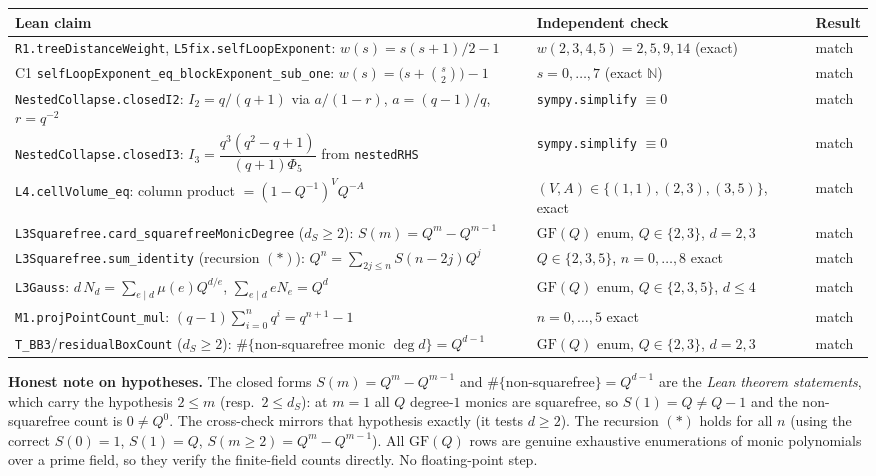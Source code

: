 \documentclass[11pt]{article}
\newcommand{\code}[1]{\texttt{#1}}
\begin{document}
\begin{longtable}{@{}p{}p{}p{}@{}}
\toprule
\textbf{Lean claim} & \textbf{Independent check} & \textbf{Result} \\
\midrule
\endhead
\code{R1.treeDistanceWeight}, \code{L5fix.selfLoopExponent}: $w(s)=s(s{+}1)/2-1$ &
$w(2,3,4,5)=2,5,9,14$ (exact) & match \\
C1 \code{selfLoopExponent\_eq\_blockExponent\_sub\_one}:
$w(s)=\big(s+\binom{s}{2}\big)-1$ & $s=0,\dots,7$ (exact $\mathbb{N}$) & match \\
\code{NestedCollapse.closedI2}: $I_2=q/(q+1)$ via $a/(1-r)$,
$a=(q-1)/q$, $r=q^{-2}$ & \code{sympy.simplify} $\equiv 0$ & match \\
\code{NestedCollapse.closedI3}:
$I_3=\dfrac{q^3(q^2-q+1)}{(q+1)\Phi_5}$ from \code{nestedRHS} &
\code{sympy.simplify} $\equiv 0$ & match \\
\code{L4.cellVolume\_eq}: column product $=(1-Q^{-1})^VQ^{-A}$ &
$(V,A)\in\{(1,1),(2,3),(3,5)\}$, exact & match \\
\code{L3Squarefree.card\_squarefreeMonicDegree} ($d_S\ge2$):
$S(m)=Q^m-Q^{m-1}$ & $\mathrm{GF}(Q)$ enum, $Q\in\{2,3\}$, $d=2,3$ & match \\
\code{L3Squarefree.sum\_identity} (recursion $(\ast)$):
$Q^n=\sum_{2j\le n}S(n{-}2j)Q^j$ & $Q\in\{2,3,5\}$, $n=0,\dots,8$ exact & match \\
\code{L3Gauss}: $d\,N_d=\sum_{e\mid d}\mu(e)Q^{d/e}$,
$\sum_{e\mid d}eN_e=Q^d$ & $\mathrm{GF}(Q)$ enum, $Q\in\{2,3,5\}$, $d\le4$ & match \\
\code{M1.projPointCount\_mul}: $(q-1)\sum_{i=0}^n q^i=q^{n+1}-1$ &
$n=0,\dots,5$ exact & match \\
\code{T\_BB3}/\code{residualBoxCount} ($d_S\ge2$): $\#\{$non-squarefree
monic $\deg d\}=Q^{d-1}$ & $\mathrm{GF}(Q)$ enum, $Q\in\{2,3\}$, $d=2,3$ & match \\
\bottomrule
\end{longtable}

\noindent\textbf{Honest note on hypotheses.} The closed forms $S(m)=Q^m-Q^{m-1}$ and
$\#\{$non-squarefree$\}=Q^{d-1}$ are the \emph{Lean theorem statements}, which carry the
hypothesis $2\le m$ (resp.\ $2\le d_S$): at $m=1$ all $Q$ degree-$1$ monics are
squarefree, so $S(1)=Q\ne Q-1$ and the non-squarefree count is $0\ne Q^0$. The cross-check
mirrors that hypothesis exactly (it tests $d\ge2$). The recursion $(\ast)$ holds for all
$n$ (using the correct $S(0)=1$, $S(1)=Q$, $S(m{\ge}2)=Q^m-Q^{m-1}$). All
$\mathrm{GF}(Q)$ rows are genuine exhaustive enumerations of monic polynomials over a prime
field, so they verify the finite-field counts directly. No floating-point step.
\end{document}

